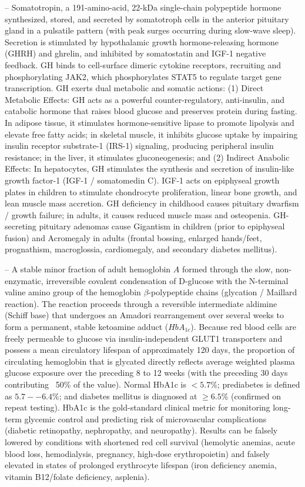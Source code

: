 -- Somatotropin, a 191-amino-acid, 22-kDa single-chain polypeptide hormone synthesized, stored, and secreted by somatotroph cells in the anterior pituitary gland in a pulsatile pattern (with peak surges occurring during slow-wave sleep). Secretion is stimulated by hypothalamic growth hormone-releasing hormone (GHRH) and ghrelin, and inhibited by somatostatin and IGF-1 negative feedback. GH binds to cell-surface dimeric cytokine receptors, recruiting and phosphorylating JAK2, which phosphorylates STAT5 to regulate target gene transcription. GH exerts dual metabolic and somatic actions: (1) Direct Metabolic Effects: GH acts as a powerful counter-regulatory, anti-insulin, and catabolic hormone that raises blood glucose and preserves protein during fasting. In adipose tissue, it stimulates hormone-sensitive lipase to promote lipolysis and elevate free fatty acids; in skeletal muscle, it inhibits glucose uptake by impairing insulin receptor substrate-1 (IRS-1) signaling, producing peripheral insulin resistance; in the liver, it stimulates gluconeogenesis; and (2) Indirect Anabolic Effects: In hepatocytes, GH stimulates the synthesis and secretion of insulin-like growth factor-1 (IGF-1 / somatomedin C). IGF-1 acts on epiphyseal growth plates in children to stimulate chondrocyte proliferation, linear bone growth, and lean muscle mass accretion. GH deficiency in childhood causes pituitary dwarfism / growth failure; in adults, it causes reduced muscle mass and osteopenia. GH-secreting pituitary adenomas cause Gigantism in children (prior to epiphyseal fusion) and Acromegaly in adults (frontal bossing, enlarged hands/feet, prognathism, macroglossia, cardiomegaly, and secondary diabetes mellitus).

-- A stable minor fraction of adult hemoglobin $A$ formed through the slow, non-enzymatic, irreversible covalent condensation of D-glucose with the N-terminal valine amino group of the hemoglobin $\beta$-polypeptide chains (glycation / Maillard reaction). The reaction proceeds through a reversible intermediate aldimine (Schiff base) that undergoes an Amadori rearrangement over several weeks to form a permanent, stable ketoamine adduct ($HbA_{1c}$). Because red blood cells are freely permeable to glucose via insulin-independent GLUT1 transporters and possess a mean circulatory lifespan of approximately 120 days, the proportion of circulating hemoglobin that is glycated directly reflects average weighted plasma glucose exposure over the preceding 8 to 12 weeks (with the preceding 30 days contributing ~50\% of the value). Normal HbA1c is $<5.7\%$; prediabetes is defined as $5.7--6.4\%$; and diabetes mellitus is diagnosed at $\ge 6.5\%$ (confirmed on repeat testing). HbA1c is the gold-standard clinical metric for monitoring long-term glycemic control and predicting risk of microvascular complications (diabetic retinopathy, nephropathy, and neuropathy). Results can be falsely lowered by conditions with shortened red cell survival (hemolytic anemias, acute blood loss, hemodialysis, pregnancy, high-dose erythropoietin) and falsely elevated in states of prolonged erythrocyte lifespan (iron deficiency anemia, vitamin B12/folate deficiency, asplenia).

